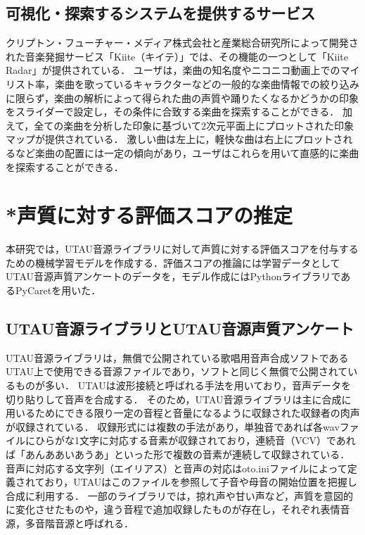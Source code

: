 \documentclass[a4j,8pt,twocolumn]{extarticle}
\begin{document}
\subsection{可視化・探索するシステムを提供するサービス}
クリプトン・フューチャー・メディア株式会社と産業総合研究所によって開発された音楽発掘サービス「Kiite（キイテ）」では、その機能の一つとして「Kiite Radar」が提供されている\cite{kiite}．
ユーザは，楽曲の知名度やニコニコ動画上でのマイリスト率，楽曲を歌っているキャラクターなどの一般的な楽曲情報での絞り込みに限らず，楽曲の解析によって得られた曲の声質や踊りたくなるかどうかの印象をスライダーで設定し，その条件に合致する楽曲を探索することができる．
加えて，全ての楽曲を分析した印象に基づいて2次元平面上にプロットされた印象マップが提供されている．
激しい曲は左上に，軽快な曲は右上にプロットされるなど楽曲の配置には一定の傾向があり，ユーザはこれらを用いて直感的に楽曲を探索することができる．

\section{*声質に対する評価スコアの推定}
本研究では，UTAU音源ライブラリに対して声質に対する評価スコアを付与するための機械学習モデルを作成する．評価スコアの推論には学習データとしてUTAU音源声質アンケートのデータを，モデル作成にはPythonライブラリであるPyCaretを用いた．

\subsection{UTAU音源ライブラリとUTAU音源声質アンケート}
UTAU音源ライブラリは，無償で公開されている歌唱用音声合成ソフトであるUTAU上で使用できる音源ファイルであり，ソフトと同じく無償で公開されているものが多い．
UTAUは波形接続と呼ばれる手法を用いており，音声データを切り貼りして音声を合成する．
そのため，UTAU音源ライブラリは主に合成に用いるためにできる限り一定の音程と音量になるように収録された収録者の肉声が収録されている．
収録形式には複数の手法があり，単独音であれば各wavファイルにひらがな1文字に対応する音素が収録されており，連続音（VCV）であれば「あんああいあうあ」\cite{tatsu3shiki}といった形で複数の音素が連続して収録されている．
音声に対応する文字列（エイリアス）と音声の対応はoto.iniファイルによって定義されており，UTAUはこのファイルを参照して子音や母音の開始位置を把握し合成に利用する．
一部のライブラリでは，掠れ声や甘い声など，声質を意図的に変化させたものや，違う音程で追加収録したものが存在し，それぞれ表情音源，多音階音源と呼ばれる．
\end{document}
